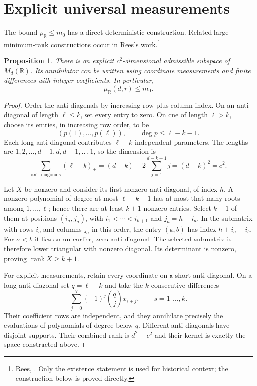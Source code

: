 \documentclass[11pt]{article}
\newtheorem{proposition}[theorem]{Proposition}
\theoremstyle{definition}
\newcommand{\R}{\mathbb R}
\newcommand{\rank}{\operatorname{rank}}
\newcommand{\muR}{\mu_{\R}}
\begin{document}
\section{Explicit universal measurements}\label{sec:universal}
The bound $\muR\leq m_0$ has a direct deterministic construction. Related large-minimum-rank constructions occur in Rees's work.\footnote{Rees, \cite{rees}. Only the existence statement is used for historical context; the construction below is proved directly.}

\begin{proposition}\label{prop:antidiagonal}
There is an explicit $c^2$-dimensional admissible subspace of $M_d(\R)$. Its annihilator can be written using coordinate measurements and finite differences with integer coefficients. In particular,
\[
 \muR(d,r)\leq m_0.
\]
\end{proposition}
\begin{proof}
Order the anti-diagonals by increasing row-plus-column index. On an anti-diagonal of length $\ell\leq k$, set every entry to zero. On one of length $\ell>k$, choose its entries, in increasing row order, to be
\[
 (p(1),\ldots,p(\ell)),\qquad \deg p\leq\ell-k-1.
\]
Each long anti-diagonal contributes $\ell-k$ independent parameters. The lengths are $1,2,\ldots,d-1,d,d-1,\ldots,1$, so the dimension is
\[
 \sum_{\text{anti-diagonals}}(\ell-k)_+
 =(d-k)+2\sum_{j=1}^{d-k-1}j=(d-k)^2=c^2.
\]

Let $X$ be nonzero and consider its first nonzero anti-diagonal, of index $h$. A nonzero polynomial of degree at most $\ell-k-1$ has at most that many roots among $1,\ldots,\ell$; hence there are at least $k+1$ nonzero entries. Select $k+1$ of them at positions $(i_a,j_a)$, with $i_1<\cdots<i_{k+1}$ and $j_a=h-i_a$. In the submatrix with rows $i_a$ and columns $j_a$ in this order, the entry $(a,b)$ has index $h+i_a-i_b$. For $a<b$ it lies on an earlier, zero anti-diagonal. The selected submatrix is therefore lower triangular with nonzero diagonal. Its determinant is nonzero, proving $\rank X\geq k+1$.

For explicit measurements, retain every coordinate on a short anti-diagonal. On a long anti-diagonal set $q=\ell-k$ and take the $k$ consecutive differences
\[
 \sum_{j=0}^{q}(-1)^j\binom qj x_{s+j},\qquad s=1,\ldots,k.
\]
Their coefficient rows are independent, and they annihilate precisely the evaluations of polynomials of degree below $q$. Different anti-diagonals have disjoint supports. Their combined rank is $d^2-c^2$ and their kernel is exactly the space constructed above.
\end{proof}
\end{document}
